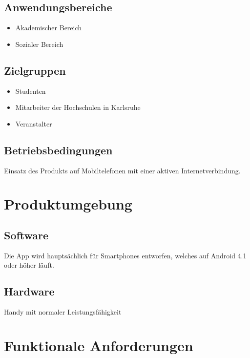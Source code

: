 \documentclass[parskip=full]{scrartcl}
\begin{document}
		\subsection{Anwendungsbereiche}
		\begin{itemize}
			\item Akademischer Bereich
			\item Sozialer Bereich
		\end{itemize}
		
		\subsection{Zielgruppen}
		\begin{itemize}
			\item Studenten
			\item Mitarbeiter der Hochschulen in Karlsruhe
			\item Veranstalter
		\end{itemize}
		
		\subsection{Betriebsbedingungen}
		Einsatz des Produkts auf Mobiltelefonen mit einer aktiven Internetverbindung.
		\newpage
		
		\section{Produktumgebung}
		
		\subsection{Software}
			Die \gls{App} wird hauptsächlich für Smartphones entworfen, welches auf Android 4.1 oder höher läuft.
		\subsection{Hardware}
		Handy mit normaler Leistungsfähigkeit
		\newpage
		\section{Funktionale Anforderungen}
\end{document}
